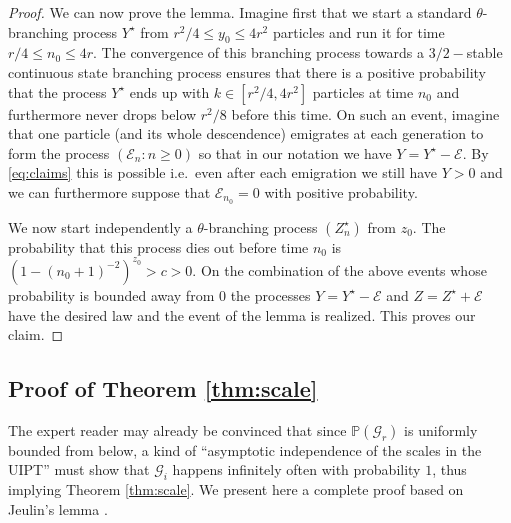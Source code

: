 \documentclass[10pt]{amsart}
\theoremstyle{definition}\newtheorem{defi}[theo]{Definition}\newtheorem{rema}[theo]{Remark}\newtheorem{exam}[theo]{Example}\newtheorem{exem}[theo]{Example}\newtheorem{nota}[theo]{Notation}
\begin{document}
\begin{proof}
We can now prove the lemma. Imagine first that we start a standard $\theta$-branching process ${Y}^{\star}$ from $ r^{2}/4 \leq y_{0} \leq 4 r^{2}$ particles and run it for time $ r/4 \leq n_{0} \leq 4r$. The convergence of this branching process towards a $3/2-$stable continuous state branching process ensures that there is a positive probability that the process $Y^\star$ ends up with $ k \in [r^{2}/4,4r^{2}]$ particles at time $n_0$ and furthermore never drops below $r^{2}/8$ before this time. On such an event, imagine that one particle (and its whole descendence) emigrates at each generation to form the process $(\mathcal{E}_{n} : n \geq 0)$ so that in our notation we have $Y = Y^{\star}-\mathcal{E}$.  By \eqref{eq:claims} this is possible i.e.~even after each emigration we still have $Y>0$ and we can furthermore suppose that $ \mathcal{E}_{n_{0}}=0$ with positive probability.

We now start independently a $\theta$-branching process $(Z_{n}^{\star})$ from $z_{0}$. The probability that this process dies out before time $n_{0}$ is $ (1- (n_{0}+1)^{-2})^{z_{0}} > c >0$. On the combination of the above events whose probability is bounded away from $0$ the processes $Y = Y^{\star}-\mathcal{E}$ and $Z = Z^{\star}+ \mathcal{E}$ have the desired law and the event of the lemma is realized. This proves our claim.
\end{proof}


\subsection{Proof of Theorem \ref{thm:scale}}
The expert reader may already be convinced that since $ \mathbb{P}( \mathcal{G}_{r})$ is uniformly bounded from below,  a kind of ``asymptotic independence of the scales in the UIPT'' must show that  $ \mathcal{G}_{i}$ happens infinitely often with probability $1$, thus implying Theorem \ref{thm:scale}. We present here a complete proof based on Jeulin's lemma \cite{Jeu82}.
\end{document}
